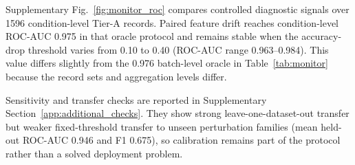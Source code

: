\documentclass[a4paper,fleqn]{els-cas-templates/cas-sc}
\begin{document}
Supplementary Fig.~\ref{fig:monitor_roc} compares controlled diagnostic signals
over 1596 condition-level Tier-A records. Paired feature drift reaches
condition-level ROC-AUC 0.975 in that oracle protocol and remains stable when
the accuracy-drop threshold varies from 0.10 to 0.40 (ROC-AUC range
0.963--0.984). This value differs slightly from the 0.976 batch-level oracle in
Table~\ref{tab:monitor} because the record sets and aggregation levels differ.

Sensitivity and transfer checks are reported in Supplementary
Section~\ref{app:additional_checks}. They show strong leave-one-dataset-out
transfer but weaker fixed-threshold transfer to unseen perturbation families
(mean held-out ROC-AUC 0.946 and F1 0.675), so calibration remains part of the
protocol rather than a solved deployment problem.
\end{document}
